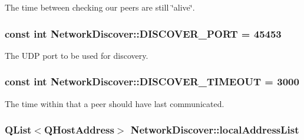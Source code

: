 \-The time between checking our peers are still \char`\"{}alive\char`\"{}. 

\hypertarget{class_network_discover_aae5acabb49790c03dd076c235fd3014c}{
\subsubsection[{\-D\-I\-S\-C\-O\-V\-E\-R\-\_\-\-P\-O\-R\-T}]{\setlength{\rightskip}{0pt plus 5cm}const int {\bf \-Network\-Discover\-::\-D\-I\-S\-C\-O\-V\-E\-R\-\_\-\-P\-O\-R\-T} = 45453}}
\label{class_network_discover_aae5acabb49790c03dd076c235fd3014c}


\-The \-U\-D\-P port to be used for discovery. 

\hypertarget{class_network_discover_aebe784b2c4a47256321246c7d4fca5e6}{
\subsubsection[{\-D\-I\-S\-C\-O\-V\-E\-R\-\_\-\-T\-I\-M\-E\-O\-U\-T}]{\setlength{\rightskip}{0pt plus 5cm}const int {\bf \-Network\-Discover\-::\-D\-I\-S\-C\-O\-V\-E\-R\-\_\-\-T\-I\-M\-E\-O\-U\-T} = 3000}}
\label{class_network_discover_aebe784b2c4a47256321246c7d4fca5e6}


\-The time within that a peer should have last communicated. 

\hypertarget{class_network_discover_a9db1fe648d568707cfcda8f00d2b5f5a}{
\subsubsection[{local\-Address\-List}]{\setlength{\rightskip}{0pt plus 5cm}\-Q\-List$<$\-Q\-Host\-Address$>$ {\bf \-Network\-Discover\-::local\-Address\-List}}}
\label{class_network_discover_a9db1fe648d568707cfcda8f00d2b5f5a}


